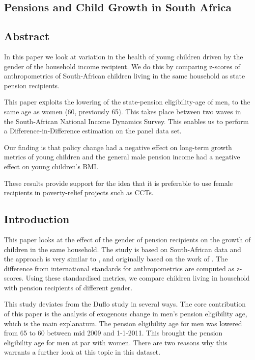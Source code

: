 \begin{refsection}
\chapter{Pensions and Child Growth in South Africa}
\label{sa}
\section*{Abstract}
In this paper we look at variation in the health of young children driven by the gender of the household income recipient.
We do this by comparing z-scores of anthropometrics of South-African children living in the same household as state pension recipients.

This paper exploits the lowering of the state-pension eligibility-age of men, 
to the same age as women (60, previously 65).
This takes place between two waves in the South-African National Income Dynamics Survey.
This enables us to perform a Difference-in-Difference estimation on the panel data set.

Our finding is that policy change had a negative effect on long-term growth metrics of young children
and the general male pension income had a negative effect on young children's BMI.

These results provide support for the idea that it is preferable to use female recipients in poverty-relief projects such as CCTs.
\pagebreak

\section{Introduction}
\label{sa:intro}
This paper looks at the effect of the gender of pension recipients on the growth of children in the same household.
The study is based on South-African data and the approach is very similar to \textcite{duflo2000child,duflo2003grandmothers},
and originally based on the work of \textcite{thomas1994like}.
The difference from international standards \parencite[WHO Child Growth Standards]{who2006child} for anthropometrics are computed as z-scores.
Using these standardised metrics, we compare children living in household with pension recipients of different gender.

This study deviates from the Duflo study in several ways.
The core contribution of this paper is the analysis of exogenous change in men's pension eligibility age,
which is the main explanatum.
The pension eligibility age for men was lowered from 65 to 60 between mid 2009 and 1-1-2011.
This brought the pension eligibility age for men at par with women.
There are two reasons why this warrants a further look at this topic in this dataset.


\end{refsection}
